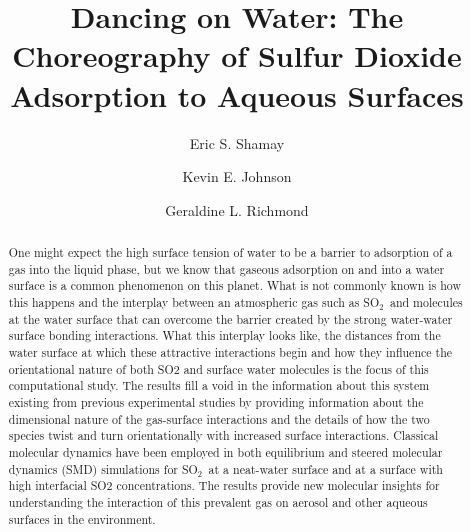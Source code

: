 \documentclass{article}
\title{Dancing on Water: The Choreography of Sulfur Dioxide Adsorption to Aqueous Surfaces}
\author{Eric S. Shamay \and Kevin E. Johnson \and Geraldine L. Richmond}
\begin{document}
\newcommand{\suldiox}{SO$_2$}
\newcommand{\ang}{\,$\textrm{\AA}$}
\newcommand{\angs}{\ang}
\newcommand{\wat}{H$_2$O}


\linenumbers 
\doublespacing


\begin{abstract}
One might expect the high surface tension of water to be a barrier to adsorption of a gas into the liquid phase, but we know that gaseous adsorption on and into a water surface is a common phenomenon on this planet.  What is not commonly known is how this happens and the interplay between an atmospheric gas such as \suldiox~and molecules at the water surface that can overcome the barrier created by the strong water-water surface bonding interactions.  What this interplay looks like, the distances from the water surface at which these attractive interactions begin and how they influence the orientational nature of both SO2 and surface water molecules is the focus of this computational study.  The results fill a void in the information about this system existing from previous experimental studies by providing information about the dimensional nature of the gas-surface interactions and the details of how the two species twist and turn orientationally with increased surface interactions.  Classical molecular dynamics have been employed in both equilibrium and steered molecular dynamics (SMD) simulations for \suldiox~at a neat-water surface and at a surface with high interfacial SO2 concentrations.  The results provide new molecular insights for understanding the interaction of this prevalent gas on aerosol and other aqueous surfaces in the environment.
\end{abstract}







\end{document}
